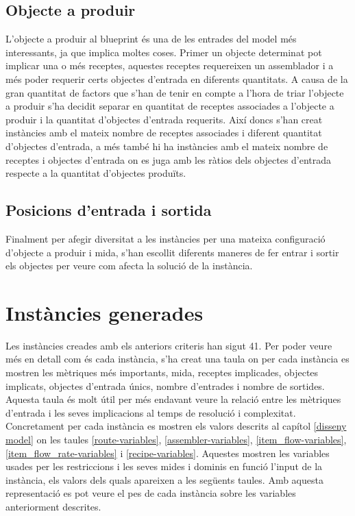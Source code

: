 \subsection{Objecte a produir}
L'objecte a produir al blueprint és una de les entrades del model més interessants, ja que implica moltes coses. Primer un objecte determinat pot implicar una o més receptes, aquestes receptes requereixen un assemblador i a més poder requerir certs objectes d'entrada en diferents quantitats. A causa de la gran quantitat de factors que s'han de tenir en compte a l'hora de triar l'objecte a produir s'ha decidit separar en quantitat de receptes associades a l'objecte a produir i la quantitat d'objectes d'entrada requerits. Així doncs s'han creat instàncies amb el mateix nombre de receptes associades i diferent quantitat d'objectes d'entrada, a més també hi ha instàncies amb el mateix nombre de receptes i objectes d'entrada on es juga amb les ràtios dels objectes d'entrada respecte a la quantitat d'objectes produïts.\\

\subsection{Posicions d'entrada i sortida}
Finalment per afegir diversitat a les instàncies per una mateixa configuració d'objecte a produir i mida, s'han escollit diferents maneres de fer entrar i sortir els objectes per veure com afecta la solució de la instància.

\section{Instàncies generades}
Les instàncies creades amb els anteriors criteris han sigut 41. Per poder veure més en detall com és cada instància, s'ha creat una taula on per cada instància es mostren les mètriques més importants, mida, receptes implicades, objectes implicats, objectes d'entrada únics, nombre d'entrades i nombre de sortides. Aquesta taula és molt útil per més endavant veure la relació entre les mètriques d'entrada i les seves implicacions al temps de resolució i complexitat.\\
Concretament per cada instància es mostren els valors descrits al capítol \ref{disseny model} on les taules \ref{route-variables}, \ref{assembler-variables}, \ref{item_flow-variables}, \ref{item_flow_rate-variables} i \ref{recipe-variables}. Aquestes mostren les variables usades per les restriccions i les seves mides i dominis en funció l'input de la instància, els valors dels quals apareixen a les següents taules. Amb aquesta representació es pot veure el pes de cada instància sobre les variables anteriorment descrites.

